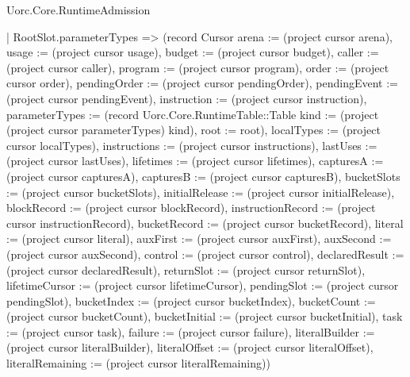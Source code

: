 \begin{lexlean}{Uorc.Core.RuntimeAdmission}
\begin{semanticmodule}
{    | RootSlot.parameterTypes => (record Cursor {arena := (project cursor arena), usage := (project cursor usage), budget := (project cursor budget), caller := (project cursor caller), program := (project cursor program), order := (project cursor order), pendingOrder := (project cursor pendingOrder), pendingEvent := (project cursor pendingEvent), instruction := (project cursor instruction), parameterTypes := (record Uorc.Core.RuntimeTable::Table {kind := (project (project cursor parameterTypes) kind), root := root}), localTypes := (project cursor localTypes), instructions := (project cursor instructions), lastUses := (project cursor lastUses), lifetimes := (project cursor lifetimes), capturesA := (project cursor capturesA), capturesB := (project cursor capturesB), bucketSlots := (project cursor bucketSlots), initialRelease := (project cursor initialRelease), blockRecord := (project cursor blockRecord), instructionRecord := (project cursor instructionRecord), bucketRecord := (project cursor bucketRecord), literal := (project cursor literal), auxFirst := (project cursor auxFirst), auxSecond := (project cursor auxSecond), control := (project cursor control), declaredResult := (project cursor declaredResult), returnSlot := (project cursor returnSlot), lifetimeCursor := (project cursor lifetimeCursor), pendingSlot := (project cursor pendingSlot), bucketIndex := (project cursor bucketIndex), bucketCount := (project cursor bucketCount), bucketInitial := (project cursor bucketInitial), task := (project cursor task), failure := (project cursor failure), literalBuilder := (project cursor literalBuilder), literalOffset := (project cursor literalOffset), literalRemaining := (project cursor literalRemaining)})
}
\end{semanticmodule}
\end{lexlean}
